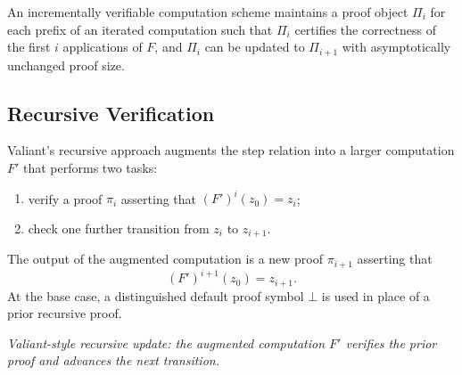 \documentclass[11pt]{article}
\begin{document}
\begin{definition}
An incrementally verifiable computation scheme maintains a proof object
$\Pi_i$ for each prefix of an iterated computation such that $\Pi_i$ certifies
the correctness of the first $i$ applications of $F$, and $\Pi_i$ can be
updated to $\Pi_{i+1}$ with asymptotically unchanged proof size.
\end{definition}

\subsection{Recursive Verification}

Valiant's recursive approach augments the step relation into a larger
computation $F'$ that performs two tasks:
\begin{enumerate}
  \item verify a proof $\pi_i$ asserting that $(F')^i(z_0)=z_i$;
  \item check one further transition from $z_i$ to $z_{i+1}$.
\end{enumerate}

The output of the augmented computation is a new proof $\pi_{i+1}$ asserting
that
\[
  (F')^{i+1}(z_0)=z_{i+1}.
\]
At the base case, a distinguished default proof symbol $\bot$ is used in place
of a prior recursive proof.

\begin{center}

\smallskip
\emph{Valiant-style recursive update: the augmented computation $F'$ verifies
the prior proof and advances the next transition.}
\end{center}
\end{document}
